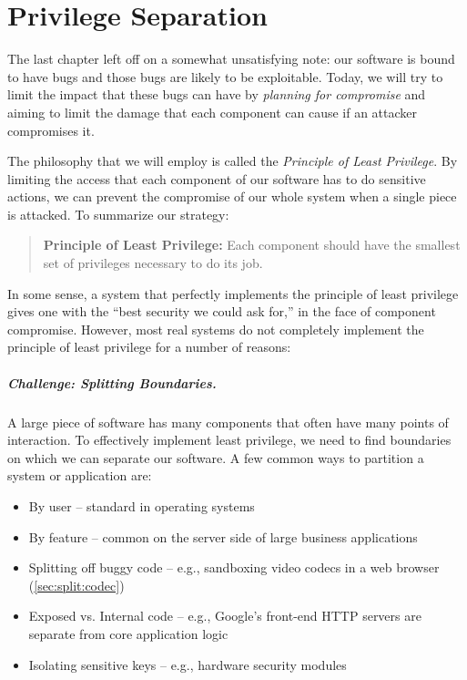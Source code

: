 \chapter{Privilege Separation}

The last chapter left off on a somewhat unsatisfying note: our software is bound to have bugs and those bugs are likely to be exploitable. Today, we will try to limit the impact that these bugs can have by \emph{planning for compromise} and aiming to limit the damage that each component can cause if an attacker compromises it.

The philosophy that we will employ is called the \emph{Principle of Least Privilege}. By limiting the access that each component of our software has to do sensitive actions, we can prevent the compromise of our whole system when a single piece is attacked.
To summarize our strategy:

\begin{quote}
  \textbf{Principle of Least Privilege:}
	Each component should have the smallest set of privileges necessary to do its job.	
\end{quote}

In some sense, a system that perfectly implements the principle of least privilege 
gives one with the ``best security we could ask for,'' in the face of component compromise.
However, most real systems do not completely implement the principle of least privilege
for a number of reasons:

\paragraph{Challenge: Splitting Boundaries.} 
A large piece of software has many components that often have many points of interaction.
To effectively implement least privilege, we need to find
boundaries on which we can separate our software. 
A few common ways to partition a system or application are:
\begin{itemize}
	\item By user -- standard in operating systems
	\item By feature -- common on the server side of large business applications
  \item Splitting off buggy code -- e.g., sandboxing video codecs in a web browser (\cref{sec:split:codec})
	\item Exposed vs. Internal code -- e.g., Google's front-end HTTP servers are separate from core application logic
	\item Isolating sensitive keys -- e.g., hardware security modules
\end{itemize}

